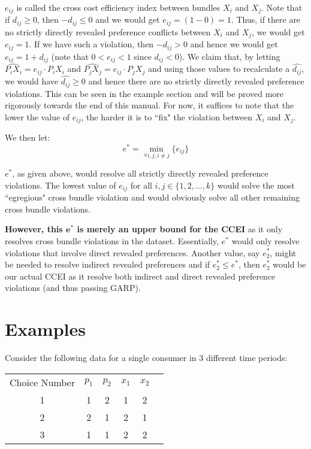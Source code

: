 \documentclass{article} %
\begin{document}
$e_{ij}$ is called the cross cost efficiency index between bundles $X_{i}$ and $X_{j}$. Note that if $d_{ij}\geq0$, then $-d_{ij}\leq0$ and we would get $e_{ij}=(1-0)=1$. Thus, if there are no strictly directly revealed preference conflicts between $X_{i}$ and $X_{j}$, we would get $e_{ij}=1$. If we have such a violation, then $-d_{ij}>0$ and hence we would get $e_{ij}=1+d_{ij}$ (note that $0<e_{ij}<1$ since $d_{ij}<0$). We claim that, by letting $\hat{ P_iX_i}=e_{ij}\cdot P_iX_i$ and $\hat{P_jX_j}=e_{ij}\cdot P_jX_j$ and using those values to recalculate a $\hat{d_{ij}}$, we would have $\hat{d_{ij}}\geq0$ and hence there are no strictly directly revealed preference violations. This can be seen in the example section and will be proved more rigorously towards the end of this manual. For now, it suffices to note that the lower the value of $e_{ij}$, the harder it is to ``fix" the violation between $X_{i}$ and $X_{j}$.


We then let:
$$e^{*}=\min_{\forall i,j, i\not=j}\{e_{ij}\}$$

$e^{*}$, as given above, would resolve all strictly directly revealed preference violations. The lowest value of $e_{ij}$ for all $i,j\in\{1,2,\ldots,k\}$ would solve the most ``egregious" cross bundle violation and would obviously solve all other remaining cross bundle violations.


\textbf{However, this $\mathbf{e^*}$ is merely an upper bound for the CCEI} as it only resolves cross bundle violations in the dataset. Essentially, $e^*$ would only resolve violations that involve direct revealed preferences. Another value, say $e^*_{2}$, might be needed to resolve indirect revealed preferences and if $e^*_{2}\leq e^*$, then $e^*_{2}$ would be our actual CCEI as it resolve both indirect and direct revealed preference violations (and thus passing GARP).

\section{Examples}

Consider the following data for a single consumer in 3 different time periods:

\begin{center}
\begin{tabular}{ cccccc } 
Choice Number & $p_{1}$ & $p_{2}$ & $x_{1}$ & $x_{2}$ \\
1&1&2&1&2 \\
2&2&1&2&1 \\
3&1&1&2&2
\end{tabular}
\end{center}
\end{document}
